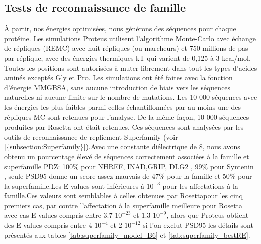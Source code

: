 \subsection{Tests de reconnaissance de famille}
À partir, nos énergies optimisées, nous générons des séquences pour chaque protéine.
Les simulations Proteus utilisent l'algorithme Monte-Carlo avec échange de répliques (REMC) avec huit répliques (ou marcheurs) et 750 millions de pas par réplique, avec des énergies thermiques kT  qui varient de 0,125 à 3 kcal/mol. Toutes les positions sont autorisées à muter librement dans tout les types d'acides aminés exceptés Gly et Pro. Les simulations ont été faites avec la fonction d'énergie MMGBSA, sans aucune introduction de biais vers les séquences naturelles ni aucune limite sur le nombre de mutations. Les 10 000 séquences avec les énergies les plus faibles parmi celles échantillonnées par au moins une des répliques MC sont retenues pour l'analyse. De la même façon, 10 000 séquences produites par Rosetta ont était retenues. Ces séquences sont analysées par les outils de reconnaissance de repliement \og Superfamily \fg (voir \ref{{subsection:Superfamily}}).Avec une constante diélectrique de 8, nous avons obtenu un pourcentage élevé de séquences correctement associées à la famille et superfamille PDZ: 100\% pour NHREF, INAD,GRIP, DLG2 , 99\%  pour Syntenin , seule PSD95 donne un score assez mauvais de 47\% pour la famille et 50\% pour la superfamille.Les E-values sont inférieures à $10^{-3}$ pour les affectations à la famille.Ces valeurs sont semblables à celles obtenues par Rosettapour les cinq premiers cas, par contre l'affectation à la superfamille meilleure pour Rosetta avec cas E-values compris entre $3.7$ $10^{-23}$ et $1.3$ $10^{-9}$, alors que Proteus obtient des E-values compris entre $4$ $10^{-4}$ et $2$ $10^{-12}$ si l'on exclut PSD95 les détails sont présentés aux tables \ref{tab:superfamily_model_B6} et \ref{tab:superfamily_bestRE}.


